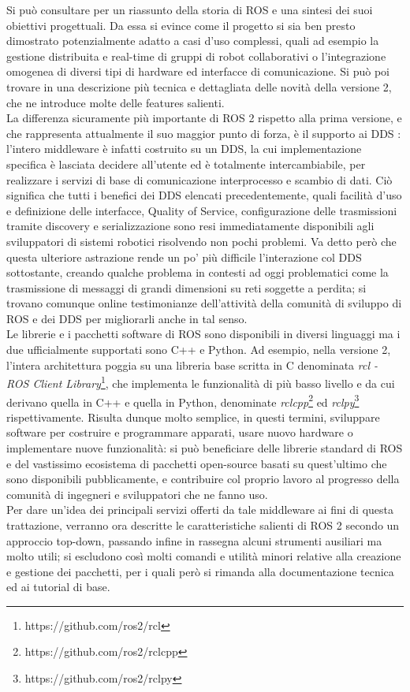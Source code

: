 Si può consultare \cite{why_ros2} per un riassunto della storia di ROS e una sintesi dei suoi obiettivi progettuali. Da essa si evince come il progetto si sia ben presto dimostrato potenzialmente adatto a casi d'uso complessi, quali ad esempio la gestione distribuita e real-time di gruppi di robot collaborativi o l'integrazione omogenea di diversi tipi di hardware ed interfacce di comunicazione. Si può poi trovare in \cite{ros2_changes} una descrizione più tecnica e dettagliata delle novità della versione 2, che ne introduce molte delle features salienti.\\
La differenza sicuramente più importante di ROS 2 rispetto alla prima versione, e che rappresenta attualmente il suo maggior punto di forza, è il supporto ai DDS \cite{ros2_dds}: l’intero middleware è infatti costruito su un DDS, la cui implementazione specifica è lasciata decidere all’utente ed è totalmente intercambiabile, per realizzare i servizi di base di comunicazione interprocesso e scambio di dati. Ciò significa che tutti i benefici dei DDS elencati precedentemente, quali facilità d'uso e definizione delle interfacce, Quality of Service, configurazione delle trasmissioni tramite discovery e serializzazione sono resi immediatamente disponibili agli sviluppatori di sistemi robotici risolvendo non pochi problemi. Va detto però che questa ulteriore astrazione rende un po' più difficile l'interazione col DDS sottostante, creando qualche problema in contesti ad oggi problematici come la trasmissione di messaggi di grandi dimensioni su reti soggette a perdita; si trovano comunque online testimonianze dell'attività della comunità di sviluppo di ROS e dei DDS per migliorarli anche in tal senso.\\
Le librerie e i pacchetti software di ROS sono disponibili in diversi linguaggi ma i due ufficialmente supportati sono C++ e Python. Ad esempio, nella versione 2, l'intera architettura poggia su una libreria base scritta in C denominata \emph{rcl - ROS Client Library}\footnote{https://github.com/ros2/rcl}, che implementa le funzionalità di più basso livello e da cui derivano quella in C++ e quella in Python, denominate \emph{rclcpp}\footnote{https://github.com/ros2/rclcpp} ed \emph{rclpy}\footnote{https://github.com/ros2/rclpy} rispettivamente. Risulta dunque molto semplice, in questi termini, sviluppare software per costruire e programmare apparati, usare nuovo hardware o implementare nuove funzionalità: si può beneficiare delle librerie standard di ROS e del vastissimo ecosistema di pacchetti open-source basati su quest'ultimo che sono disponibili pubblicamente, e contribuire col proprio lavoro al progresso della comunità di ingegneri e sviluppatori che ne fanno uso.\\
Per dare un'idea dei principali servizi offerti da tale middleware ai fini di questa trattazione, verranno ora descritte le caratteristiche salienti di ROS 2 secondo un approccio top-down, passando infine in rassegna alcuni strumenti ausiliari ma molto utili; si escludono così molti comandi e utilità minori relative alla creazione e gestione dei pacchetti, per i quali però si rimanda alla documentazione tecnica ed ai tutorial di base.

